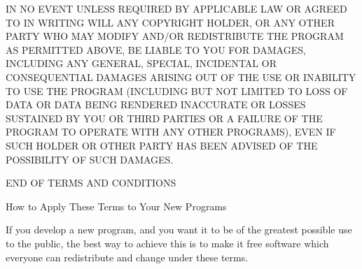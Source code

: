 \begin{DoxyEnumerate}
\item I\-N N\-O E\-V\-E\-N\-T U\-N\-L\-E\-S\-S R\-E\-Q\-U\-I\-R\-E\-D B\-Y A\-P\-P\-L\-I\-C\-A\-B\-L\-E L\-A\-W O\-R A\-G\-R\-E\-E\-D T\-O I\-N W\-R\-I\-T\-I\-N\-G W\-I\-L\-L A\-N\-Y C\-O\-P\-Y\-R\-I\-G\-H\-T H\-O\-L\-D\-E\-R, O\-R A\-N\-Y O\-T\-H\-E\-R P\-A\-R\-T\-Y W\-H\-O M\-A\-Y M\-O\-D\-I\-F\-Y A\-N\-D/\-O\-R R\-E\-D\-I\-S\-T\-R\-I\-B\-U\-T\-E T\-H\-E P\-R\-O\-G\-R\-A\-M A\-S P\-E\-R\-M\-I\-T\-T\-E\-D A\-B\-O\-V\-E, B\-E L\-I\-A\-B\-L\-E T\-O Y\-O\-U F\-O\-R D\-A\-M\-A\-G\-E\-S, I\-N\-C\-L\-U\-D\-I\-N\-G A\-N\-Y G\-E\-N\-E\-R\-A\-L, S\-P\-E\-C\-I\-A\-L, I\-N\-C\-I\-D\-E\-N\-T\-A\-L O\-R C\-O\-N\-S\-E\-Q\-U\-E\-N\-T\-I\-A\-L D\-A\-M\-A\-G\-E\-S A\-R\-I\-S\-I\-N\-G O\-U\-T O\-F T\-H\-E U\-S\-E O\-R I\-N\-A\-B\-I\-L\-I\-T\-Y T\-O U\-S\-E T\-H\-E P\-R\-O\-G\-R\-A\-M (I\-N\-C\-L\-U\-D\-I\-N\-G B\-U\-T N\-O\-T L\-I\-M\-I\-T\-E\-D T\-O L\-O\-S\-S O\-F D\-A\-T\-A O\-R D\-A\-T\-A B\-E\-I\-N\-G R\-E\-N\-D\-E\-R\-E\-D I\-N\-A\-C\-C\-U\-R\-A\-T\-E O\-R L\-O\-S\-S\-E\-S S\-U\-S\-T\-A\-I\-N\-E\-D B\-Y Y\-O\-U O\-R T\-H\-I\-R\-D P\-A\-R\-T\-I\-E\-S O\-R A F\-A\-I\-L\-U\-R\-E O\-F T\-H\-E P\-R\-O\-G\-R\-A\-M T\-O O\-P\-E\-R\-A\-T\-E W\-I\-T\-H A\-N\-Y O\-T\-H\-E\-R P\-R\-O\-G\-R\-A\-M\-S), E\-V\-E\-N I\-F S\-U\-C\-H H\-O\-L\-D\-E\-R O\-R O\-T\-H\-E\-R P\-A\-R\-T\-Y H\-A\-S B\-E\-E\-N A\-D\-V\-I\-S\-E\-D O\-F T\-H\-E P\-O\-S\-S\-I\-B\-I\-L\-I\-T\-Y O\-F S\-U\-C\-H D\-A\-M\-A\-G\-E\-S. \begin{DoxyVerb}                 END OF TERMS AND CONDITIONS

        How to Apply These Terms to Your New Programs
\end{DoxyVerb}

\end{DoxyEnumerate}

If you develop a new program, and you want it to be of the greatest possible use to the public, the best way to achieve this is to make it free software which everyone can redistribute and change under these terms.

